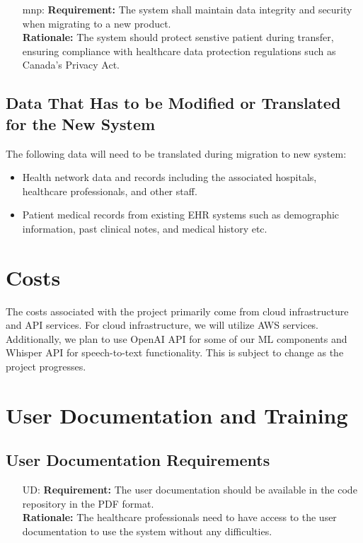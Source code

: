 \documentclass[12pt]{article}
\newcounter{udnum} %
\newcounter{mnpnum} %
\begin{document}
\begin{itemize}
\begin{itemize}
  \item [mnp\refstepcounter{mnpnum}\themnpnum \label{MNP_security}:] 
  \textbf{Requirement:} The system shall maintain data integrity and security when migrating to a new product.\\
  \textbf{Rationale:} The system should protect senstive patient during transfer, ensuring compliance with healthcare data protection regulations such as Canada's Privacy Act.\\
\end{itemize}

\subsection{Data That Has to be Modified or Translated for the New System}
The following data will need to be translated during migration to new system: 
\begin{itemize}
  \item Health network data and records including the associated hospitals, healthcare professionals, and other staff. 
  \item Patient medical records from existing EHR systems such as demographic information, past clinical notes, and medical history etc.
\end{itemize}

\section{Costs}
The costs associated with the project primarily come from cloud infrastructure and API services. For cloud infrastructure, we will utilize AWS services. Additionally, we plan to use OpenAI API for some of our ML components and Whisper API for speech-to-text functionality. This is subject to change as the project progresses. 

\section{User Documentation and Training}
\subsection{User Documentation Requirements}
\begin{itemize}
  \item [UD\refstepcounter{udnum}\theudnum \label{UD_doc1}:] 
  \textbf{Requirement:} The user documentation should be available in the code repository in the PDF format.\\
  \textbf{Rationale:} The healthcare professionals need to have access to the user documentation to use the system without any difficulties.\\


\end{itemize}
\end{itemize}
\end{document}
